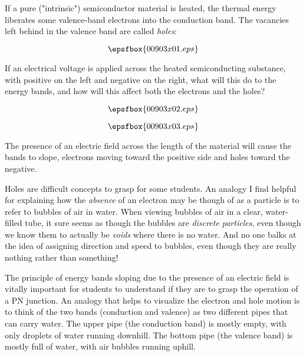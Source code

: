 

If a pure ("intrinsic") semiconductor material is heated, the thermal energy liberates some valence-band electrons into the conduction band.  The vacancies left behind in the valence band are called {\it holes}:

$$\epsfbox{00903x01.eps}$$

If an electrical voltage is applied across the heated semiconducting substance, with positive on the left and negative on the right, what will this do to the energy bands, and how will this affect both the electrons and the holes?

$$\epsfbox{00903x02.eps}$$







$$\epsfbox{00903x03.eps}$$

The presence of an electric field across the length of the material will cause the bands to slope, electrons moving toward the positive side and holes toward the negative.







Holes are difficult concepts to grasp for some students.  An analogy I find helpful for explaining how the {\it absence} of an electron may be though of as a particle is to refer to bubbles of air in water.  When viewing bubbles of air in a clear, water-filled tube, it sure seems as though the bubbles are {\it discrete particles}, even though we know them to actually be {\it voids} where there is no water.  And no one balks at the idea of assigning direction and speed to bubbles, even though they are really nothing rather than something!

The principle of energy bands sloping due to the presence of an electric field is vitally important for students to understand if they are to grasp the operation of a PN junction.  An analogy that helps to visualize the electron and hole motion is to think of the two bands (conduction and valence) as two different pipes that can carry water.  The upper pipe (the conduction band) is mostly empty, with only droplets of water running downhill.  The bottom pipe (the valence band) is mostly full of water, with air bubbles running uphill.


